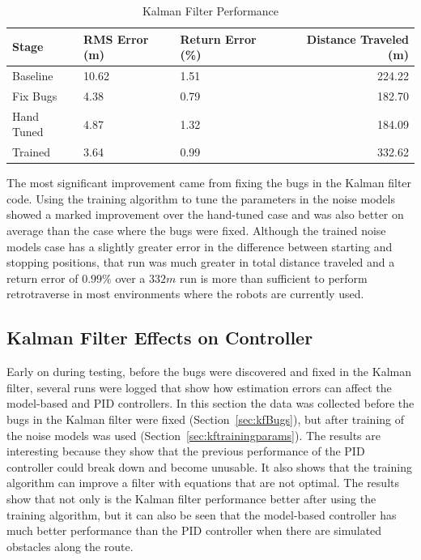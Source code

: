\begin{table}[ht!]
\caption{Kalman Filter Performance}
\small
\centering
\begin{tabular}{@{}lllr@{}} \toprule
Stage      & RMS Error (m)  & Return Error (\%) & Distance Traveled (m) \\ \midrule
Baseline   & 10.62          & 1.51              & 224.22 \\
Fix Bugs   & 4.38           & 0.79              & 182.70 \\
Hand Tuned & 4.87           & 1.32              & 184.09 \\
Trained    & 3.64           & 0.99              & 332.62 \\ \bottomrule
\end{tabular}%
\label{tab:resultsKF}
\end{table}

The most significant improvement came from fixing the bugs in the Kalman filter code.
Using the training algorithm to tune the parameters in the noise models showed a marked improvement over the hand-tuned case and was also better on average than the case where the bugs were fixed.
Although the trained noise models case has a slightly greater error in the difference between starting and stopping positions, that run was much greater in total distance traveled and a return error of $0.99\%$ over a $332m$ run is more than sufficient to perform retrotraverse in most environments where the robots are currently used.

\subsection{Kalman Filter Effects on Controller}
Early on during testing, before the bugs were discovered and fixed in the Kalman filter, several runs were logged that show how estimation errors can affect the model-based and PID controllers.
In this section the data was collected before the bugs in the Kalman filter were fixed (Section~\ref{sec:kfBugs}), but after training of the noise models was used (Section~\ref{sec:kftrainingparams}).
The results are interesting because they show that the previous performance of the PID controller could break down and become unusable.
It also shows that the training algorithm can improve a filter with equations that are not optimal.
The results show that not only is the Kalman filter performance better after using the training algorithm, but it can also be seen that the model-based controller has much better performance than the PID controller when there are simulated obstacles along the route.

